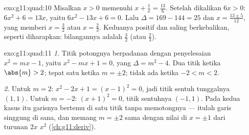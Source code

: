 \begin{solution}{exo:g11:quad:10}
Misalkan $x > 0$ memenuhi $x + \frac1x = \frac{13}{6}$. Setelah dikalikan
$6x > 0$: $6x^2 + 6 = 13x$, yaitu $6x^2 - 13x + 6 = 0$. Lalu
$\Delta = 169 - 144 = 25$ dan $x = \frac{13 \pm 5}{12}$, yang memberi
$x = \frac32$ atau $x = \frac23$. Keduanya positif dan saling berkebalikan,
seperti diharapkan: bilangannya adalah $\frac32$ (atau $\frac23$).
\end{solution}

\begin{solution}{exo:g11:quad:11}
\emph{1.} Titik potongnya berpadanan dengan penyelesaian $x^2 = mx - 1$, yaitu
$x^2 - mx + 1 = 0$, yang  $\Delta = m^2 - 4$. Dua titik
ketika $\abs{m} > 2$; tepat satu ketika $m = \pm 2$; tidak ada ketika $-2 < m < 2$.

\emph{2.} Untuk $m = 2$: $x^2 - 2x + 1 = (x-1)^2 = 0$, jadi titik sentuh
tunggalnya $(1, 1)$. Untuk $m = -2$: $(x+1)^2 = 0$, titik sentuhnya $(-1, 1)$.
Pada kedua kasus itu garisnya bertemu  di satu titik tanpa
memotongnya --- itulah garis singgung di sana, dan memang  $m = \pm 2$
sama dengan nilai di $x = \pm 1$ dari turunan $2x$  $x^2$
(\cref{ch:g11:deriv}).
\end{solution}

